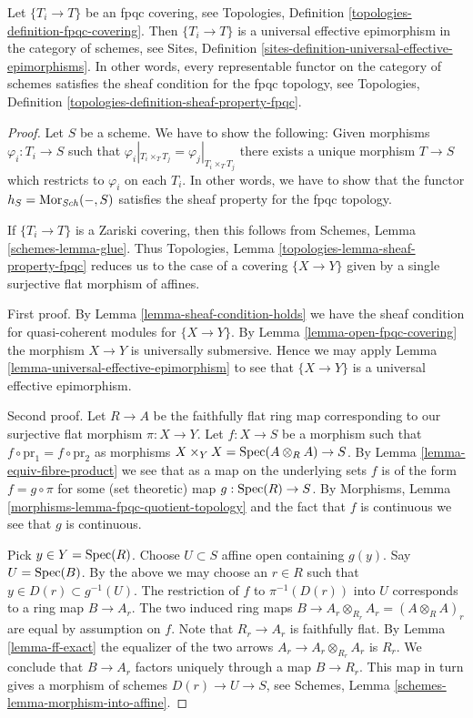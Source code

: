\begin{lemma}
\label{lemma-fpqc-universal-effective-epimorphisms}
Let $\{T_i \to T\}$ be an fpqc covering, see
Topologies, Definition \ref{topologies-definition-fpqc-covering}.
Then $\{T_i \to T\}$ is a universal effective epimorphism
in the category of schemes, see
Sites, Definition \ref{sites-definition-universal-effective-epimorphisms}.
In other words, every representable functor on the category of schemes
satisfies the sheaf condition for the fpqc topology, see
Topologies, Definition \ref{topologies-definition-sheaf-property-fpqc}.
\end{lemma}

\begin{proof}
Let $S$ be a scheme. We have to show the following:
Given morphisms $\varphi_i : T_i \to S$
such that $\varphi_i|_{T_i \times_T T_j} = \varphi_j|_{T_i \times_T T_j}$
there exists a unique morphism $T \to S$ which restricts
to $\varphi_i$ on each $T_i$.
In other words, we have to show that the functor
$h_S = \mathop{\mathrm{Mor}}\nolimits_{\mathit{Sch}}( - , S)$ satisfies
the sheaf property for the fpqc topology.

\medskip\noindent
If $\{T_i \to T\}$ is a Zariski covering, then this follows from
Schemes, Lemma \ref{schemes-lemma-glue}.
Thus Topologies, Lemma \ref{topologies-lemma-sheaf-property-fpqc}
reduces us to the case of a covering $\{X \to Y\}$
given by a single surjective flat morphism of affines.

\medskip\noindent
First proof. By Lemma \ref{lemma-sheaf-condition-holds}
we have the sheaf condition for quasi-coherent modules
for $\{X \to Y\}$. By Lemma \ref{lemma-open-fpqc-covering}
the morphism $X \to Y$ is universally submersive.
Hence we may apply Lemma \ref{lemma-universal-effective-epimorphism}
to see that $\{X \to Y\}$ is a universal effective epimorphism.

\medskip\noindent
Second proof. Let $R \to A$ be the faithfully flat ring map
corresponding to our surjective flat morphism $\pi : X \to Y$.
Let $f : X \to S$ be a morphism
such that $f \circ \text{pr}_1 = f \circ \text{pr}_2$
as morphisms $X \times_Y X = \mathop{\mathrm{Spec}}(A \otimes_R A) \to S$.
By Lemma \ref{lemma-equiv-fibre-product} we see that
as a map on the underlying
sets $f$ is of the form $f = g \circ \pi$ for some
(set theoretic) map $g : \mathop{\mathrm{Spec}}(R) \to S$.
By Morphisms, Lemma \ref{morphisms-lemma-fpqc-quotient-topology}
and the fact that $f$ is continuous we see that $g$
is continuous.

\medskip\noindent
Pick $y \in Y = \mathop{\mathrm{Spec}}(R)$.
Choose $U \subset S$ affine open containing $g(y)$.
Say $U = \mathop{\mathrm{Spec}}(B)$.
By the above we may choose an $r \in R$ such that
$y \in D(r) \subset g^{-1}(U)$.
The restriction of $f$ to $\pi^{-1}(D(r))$ into $U$
corresponds to a ring map $B \to A_r$. The two induced
ring maps $B \to A_r \otimes_{R_r} A_r = (A \otimes_R A)_r$ are equal
by assumption on $f$.
Note that $R_r \to A_r$ is faithfully flat.
By Lemma \ref{lemma-ff-exact} the equalizer of
the two arrows $A_r \to A_r \otimes_{R_r} A_r$ is $R_r$.
We conclude that $B \to A_r$ factors uniquely through a map $B \to R_r$.
This map in turn gives a morphism of schemes $D(r) \to U \to S$,
see Schemes, Lemma \ref{schemes-lemma-morphism-into-affine}.


\end{proof}
